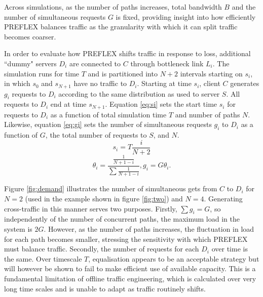 Across simulations, as the number of paths increases, total bandwidth $B$ and the number of simultaneous requests $G$ is fixed, providing insight into how efficiently \ac{PREFLEX} balances traffic as the granularity with which it can split traffic becomes coarser.

In order to evaluate how \ac{PREFLEX} shifts traffic in response to loss, additional ``dummy" servers $D_i$ are connected to $C$ through bottleneck link $L_i$.
The simulation runs for time $T$ and is partitioned into $N+2$ intervals starting on $s_i$, in which $s_0$ and $s_{N+1}$ have no traffic to $D_i$. 
Starting at time $s_i$, client $C$ generates $g_i$ requests to $D_i$ according to the same distribution as used to server $S$. 
All requests to $D_i$ end at time $s_{N+1}$. 
Equation \eqref{eq:si} sets the start time $s_i$ for requests to $D_i$ as a function of total simulation time $T$ and number of paths $N$. 
Likewise, equation \eqref{eq:gi} sets the number of simultaneous requests $g_i$ to $D_i$ as a function of $G$, the total number of requests to $S$, and $N$.
\begin{equation}
s_i = T\frac{i}{N+2}
\label{eq:si}
\end{equation}
\begin{equation}
\theta_i = \frac{\frac{1}{N+1-i}}{\sum{\frac{1}{N+1-i}}},  g_i = G\theta_i.
\label{eq:gi}
\end{equation}

Figure \ref{fig:demand} illustrates the number of simultaneous gets from $C$ to $D_i$ for $N=2$ (used in the example shown in figure \ref{fig:two}) and $N=4$. 
Generating cross-traffic in this manner serves two purposes. 
Firstly, $\sum{g_i}=G$, so independently of the number of concurrent paths, the maximum load in the system is $2G$. 
However, as the number of paths increases, the fluctuation in load for each path becomes smaller, stressing the sensitivity with which \ac{PREFLEX} must balance traffic. 
Secondly, the number of requests for each $D_i$ over time is the same. 
Over timescale $T$, equalisation appears to be an acceptable strategy but will however be shown to fail to make efficient use of available capacity. 
This is a fundamental limitation of offline traffic engineering, which is calculated over very long time scales and is unable to adapt as traffic routinely shifts.

